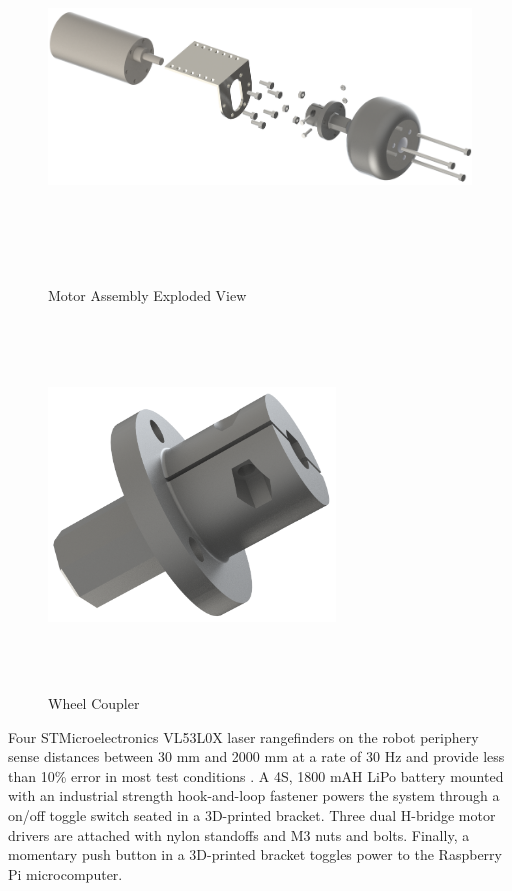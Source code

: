 \begin{figure}[H]   %
	\centering \includegraphics[width=6in, height=3.85in, keepaspectratio]{figures/motor_assem_explode.png}
	\caption{Motor Assembly Exploded View}	\label{fig:motor_assem_explode}
\end{figure}
\begin{figure}[H]   %
	\centering \includegraphics[width=3in, height=3.85in, keepaspectratio]{figures/wheel_coupler.png}
	\caption{Wheel Coupler}	\label{fig:wheel_coupler}
\end{figure}

Four STMicroelectronics VL53L0X laser rangefinders on the robot periphery sense distances between 30 mm and 2000 mm at a rate of 30 Hz and provide less than 10\% error in most test conditions \cite{vl53l0x_datasheet}. A 4S, 1800 mAH LiPo battery \cite{battery} mounted with an industrial strength hook-and-loop fastener powers the system through a on/off toggle switch seated in a 3D-printed bracket. Three dual H-bridge motor drivers are attached with nylon standoffs and M3 nuts and bolts. Finally, a momentary push button in a 3D-printed bracket toggles power to the Raspberry Pi microcomputer.

